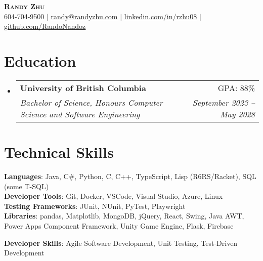 \documentclass[letterpaper,11pt]{article}
\makeatletter
\newcommand{\resumeSubheading}[4]{
  \vspace{-2pt}\item
    \begin{tabular*}{0.97\textwidth}[t]{l@{\extracolsep{\fill}}r}
      \textbf{#1} & #2 \\
      \textit{\small#3} & \textit{\small #4} \\
    \end{tabular*}\vspace{-7pt}
}
\newcommand{\resumeSubHeadingListStart}{\begin{itemize}[leftmargin=0.15in, label={}]}
\newcommand{\resumeSubHeadingListEnd}{\end{itemize}}
\makeatother
\begin{document}

\begin{center}
  \textbf{\Huge \scshape Randy Zhu} \\ \vspace{1pt}
  \small 604-704-9500 $|$ \href{mailto:randy@randyzhu.com}{\underline{randy@randyzhu.com}} $|$
  \href{https://www.linkedin.com/in/rzhu08/}{\underline{linkedin.com/in/rzhu08}} $|$
  \href{https://github.com/RandoNandoz}{\underline{github.com/RandoNandoz}}
\end{center}

\section{Education}
\resumeSubHeadingListStart
\resumeSubheading
{University of British Columbia}{GPA: 88\%}
{Bachelor of Science, Honours Computer Science and Software Engineering}{September 2023 -- May 2028}
\resumeSubHeadingListEnd

%
\section{Technical Skills}
\begin{itemize}[leftmargin=0.15in, label={}]
  \small{\item{
        \textbf{Languages}{: Java, C\#, Python, C, C++, TypeScript, Lisp (R6RS/Racket), SQL (some T-SQL)} \\
        \textbf{Developer Tools}{: Git, Docker, VSCode, Visual Studio, Azure, Linux} \\
        \textbf{Testing Frameworks}{: JUnit, NUnit, PyTest, Playwright} \\
        \textbf{Libraries}{:
          pandas, Matplotlib, MongoDB, jQuery, React, Swing, Java AWT,
          Power Apps Component Framework, Unity Game Engine, Flask, Firebase
        } \\}}
        \textbf{Developer Skills}{: Agile Software Development, Unit Testing, Test-Driven Development }
\end{itemize}
\end{document}

